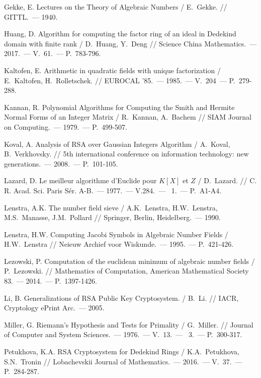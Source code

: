 \documentclass[_00_dissertation.tex]{subfiles}
\begin{document}
\begin{thebibliography}{99}
    Gekke, E. Lectures on the Theory of Algebraic Numbers / E.~Gekke. // GITTL.~--- 1940.

    Huang, D. Algorithm for computing the factor ring of an ideal in Dedekind domain with finite rank / D.~Huang, Y.~Deng // Science China Mathematics.~--- 2017.~--- V.~61.~--- P.~783-796.

    Kaltofen, E. Arithmetic in quadratic fields with unique factorization / E.~Kaltofen, H.~Rolletschek. // EUROCAL '85.~--- 1985.~--- V.~204~--- P.~279-288.

    Kannan, R. Polynomial Algorithms for Computing the Smith and Hermite Normal Forms of an Integer Matrix / R.~Kannan, A.~Bachem // SIAM Journal on Computing.~--- 1979.~--- P.~499-507.

    Koval, A. Analysis of RSA over Gaussian Integers Algorithm / A.~Koval, B.~Verkhovsky. // 5th international conference on information technology: new generations.~--- 2008.~--- P.~101-105.
    
    Lazard, D. Le meilleur algorithme d'{E}uclide pour {$K[X]$} et {$Z$} / D.~Lazard. // C. R. Acad. Sci. Paris S\'er. A-B.~--- 1977.~--- V.284.~--- \textnumero~1.~--- P.~A1-A4.
    
    Lenstra, A.K. The number field sieve / A.K.~Lenstra, H.W.~Lenstra, M.S.~Manasse, J.M.~Pollard // Springer, Berlin, Heidelberg.~--- 1990.

    Lenstra, H.W. Computing Jacobi Symbols in Algebraic Number Fields / H.W.~Lenstra // Neieuw Archief voor Wiskunde.~--- 1995.~--- P.~421-426.

    Lezowski, P. Computation of the euclidean minimum of algebraic number fields / P.~Lezowski. // Mathematics of Computation, American Mathematical Society 83.~--- 2014.~--- P.~1397-1426.

    Li, B. Generalizations of RSA Public Key Cryptosystem. / B.~Li. // IACR, Cryptology ePrint Arc.~--- 2005.

    Miller, G. Riemann's Hypothesis and Tests for Primality / G.~Miller. // Journal of Computer and System Sciences.~--- 1976.~--- V.~13.~--- ~3.~--- P.~300-317.
    
    Petukhova, K.A. RSA Cryptosystem for Dedekind Rings / K.A.~Petukhova, S.N.~Tronin // Lobachevskii Journal of Mathematics.~--- 2016.~--- V.~37.~--- P.~284-287.
    

\end{thebibliography}
\end{document}
